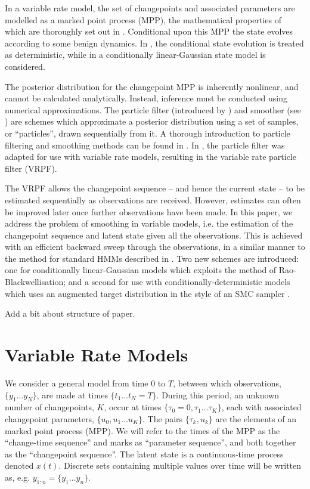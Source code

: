 \documentclass[journal]{IEEEtran}
\begin{document}
In a variable rate model, the set of changepoints and associated parameters are modelled as a marked point process (MPP), the mathematical properties of which are thoroughly set out in \cite{Jacobsen2006}. Conditional upon this MPP the state evolves according to some benign dynamics. In \cite{Godsill2007,Whiteley2011}, the conditional state evolution is treated as deterministic, while in \cite{Godsill2007a,Christensen2012} a conditionally linear-Gaussian state model is considered.

The posterior distribution for the changepoint MPP is inherently nonlinear, and cannot be calculated analytically. Instead, inference must be conducted using numerical approximations. The particle filter (introduced by \cite{Gordon1993}) and smoother (see \cite{Doucet2000a,Godsill2004}) are schemes which approximate a posterior distribution using a set of samples, or ``particles'', drawn sequentially from it.  A thorough introduction to particle filtering and smoothing methods can be found in \cite{Cappe2007,Doucet2009}. In \cite{Godsill2007a,Godsill2007,Whiteley2011}, the particle filter was adapted for use with variable rate models, resulting in the variable rate particle filter (VRPF).

The VRPF allows the changepoint sequence -- and hence the current state -- to be estimated sequentially as observations are received. However, estimates can often be improved later once further observations have been made. In this paper, we address the problem of smoothing in variable models, i.e. the estimation of the changepoint sequence and latent state given all the observations. This is achieved with an efficient backward sweep through the observations, in a similar manner to the method for standard HMMs described in \cite{Godsill2004}. Two new schemes are introduced: one for conditionally linear-Gaussian models which exploits the method of Rao-Blackwellisation; and a second for use with conditionally-deterministic models which uses an augmented target distribution in the style of an SMC sampler \cite{DelMoral2006}.

{\meta Add a bit about structure of paper.}



\section{Variable Rate Models} \label{sec:vr_models}

We consider a general model from time $0$ to $T$, between which observations, $\{y_1 \dots y_N\}$, are made at times $\{t_1 \dots t_N = T\}$. During this period, an unknown number of changepoints, $K$, occur at times $\{\tau_0 = 0, \tau_1 \dots \tau_K \}$, each with associated changepoint parameters, $\{ u_0, u_1 \dots u_K \}$. The pairs $\{\tau_k, u_k\}$ are the elements of an marked point process (MPP). We will refer to the times of the MPP as the ``change-time sequence'' and marks as ``parameter sequence'', and both together as the ``changepoint sequence''. The latent state is a continuous-time process denoted $x(t)$. Discrete sets containing multiple values over time will be written as, e.g. $y_{1:n} = \{y_1 \dots y_n\}$.
\end{document}
